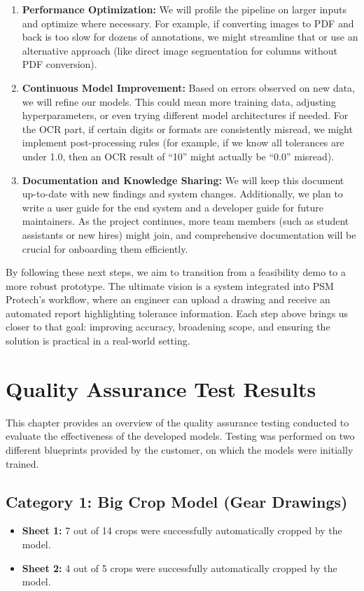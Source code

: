 \documentclass[11pt,a4paper]{article}
\begin{document}
\begin{enumerate}
  \item \textbf{Performance Optimization:} We will profile the pipeline on larger inputs and optimize where necessary. For example, if converting images to PDF and back is too slow for dozens of annotations, we might streamline that or use an alternative approach (like direct image segmentation for columns without PDF conversion).
  \item \textbf{Continuous Model Improvement:} Based on errors observed on new data, we will refine our models. This could mean more training data, adjusting hyperparameters, or even trying different model architectures if needed. For the OCR part, if certain digits or formats are consistently misread, we might implement post-processing rules (for example, if we know all tolerances are under 1.0, then an OCR result of “10” might actually be “0.0” misread).
  \item \textbf{Documentation and Knowledge Sharing:} We will keep this document up-to-date with new findings and system changes. Additionally, we plan to write a user guide for the end system and a developer guide for future maintainers. As the project continues, more team members (such as student assistants or new hires) might join, and comprehensive documentation will be crucial for onboarding them efficiently.
\end{enumerate}

By following these next steps, we aim to transition from a feasibility demo to a more robust prototype. The ultimate vision is a system integrated into PSM Protech’s workflow, where an engineer can upload a drawing and receive an automated report highlighting tolerance information. Each step above brings us closer to that goal: improving accuracy, broadening scope, and ensuring the solution is practical in a real-world setting.

\section{Quality Assurance Test Results}

This chapter provides an overview of the quality assurance testing conducted to evaluate the effectiveness of the developed models. Testing was performed on two different blueprints provided by the customer, on which the models were initially trained.

\subsection*{Category 1: Big Crop Model (Gear Drawings)}
\begin{itemize}
\item \textbf{Sheet 1:} 7 out of 14 crops were successfully automatically cropped by the model.
\item \textbf{Sheet 2:} 4 out of 5 crops were successfully automatically cropped by the model.
\end{itemize}
\end{document}
